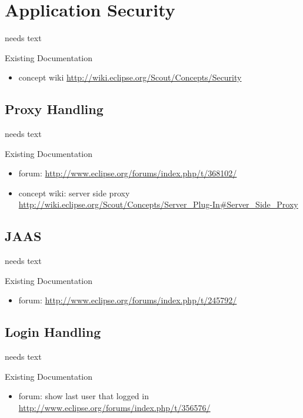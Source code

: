 \documentclass[a4paper,10pt,twoside]{book}
\begin{document}
  \sloppy
\fi

\chapter{Application Security}
needs text

\noindent Existing Documentation
\begin{itemize}
  \item concept wiki \url{http://wiki.eclipse.org/Scout/Concepts/Security}
\end{itemize}

\section{Proxy Handling}
needs text

\noindent Existing Documentation
\begin{itemize}
  \item forum: \url{http://www.eclipse.org/forums/index.php/t/368102/}
  \item concept wiki: server side proxy \url{http://wiki.eclipse.org/Scout/Concepts/Server_Plug-In#Server_Side_Proxy}
\end{itemize}

\section{JAAS}
needs text

\noindent Existing Documentation
\begin{itemize}
  \item forum: \url{http://www.eclipse.org/forums/index.php/t/245792/}
\end{itemize}

\section{Login Handling}
needs text

\noindent Existing Documentation
\begin{itemize}
  \item forum: show last user that logged in \url{http://www.eclipse.org/forums/index.php/t/356576/}
\end{itemize}
\end{document}
